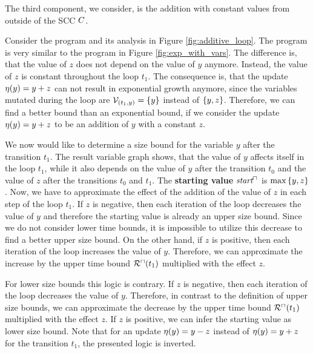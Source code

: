 The third component, we consider, is the addition with constant values from outside of the SCC $C$.

\begin{example}
  
  Consider the program and its analysis in Figure \ref{fig:additive_loop}.
  The program is very similar to the program in Figure \ref{fig:exp_with_vars}.
  The difference is, that the value of $z$ does not depend on the value of $y$ anymore.
  Instead, the value of $z$ is constant throughout the loop $t_1$.
  The consequence is, that the update $\eta(y) = y + z$ can not result in exponential growth anymore, since the variables mutated during the loop are $\mathcal{V}_{(t_1,y)} = \lbrace y \rbrace$ instead of $\lbrace y,z \rbrace$.
  Therefore, we can find a better bound than an exponential bound, if we consider the update $\eta(y) = y + z$ to be an addition of $y$ with a constant $z$.
  
  We now would like to determine a size bound for the variable $y$ after the transition $t_1$.
  The result variable graph shows, that the value of $y$ affects itself in the loop $t_1$, while it also depends on the value of $y$ after the transition $t_0$ and the value of $z$ after the transitions $t_0$ and $t_1$.
  The \textbf{starting value} $\emph{start}^\sqcap$ is $\max \left\lbrace y,z \right\rbrace$.
  Now, we have to approximate the effect of the addition of the value of $z$ in each step of the loop $t_1$.
  If $z$ is negative, then each iteration of the loop decreases the value of $y$ and therefore the starting value is already an upper size bound.
  Since we do not consider lower time bounds, it is impossible to utilize this decrease to find a better upper size bound.
  On the other hand, if $z$ is positive, then each iteration of the loop increases the value of $y$.
  Therefore, we can approximate the increase by the upper time bound ${\mathcal{R}^\sqcap}(t_1)$ multiplied with the effect $z$.
  
  For lower size bounds this logic is contrary.
  If $z$ is negative, then each iteration of the loop decreases the value of $y$.
  Therefore, in contrast to the definition of upper size bounds, we can approximate the decrease by the upper time bound ${\mathcal{R}^\sqcap}(t_1)$ multiplied with the effect $z$.
  If $z$ is positive, we can infer the starting value as lower size bound.
  Note that for an update $\eta(y) = y - z$ instead of $\eta(y) = y + z$ for the transition $t_1$, the presented logic is inverted.
  

\end{example}
